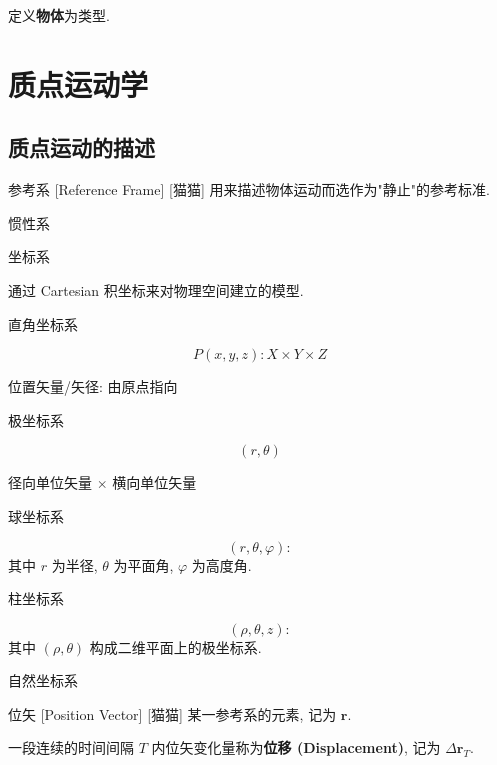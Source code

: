 \documentclass[UTF8]{ctexart}
\begin{document}
        \begin{dfn}
            定义\textbf{物体}为类型. 
        \end{dfn}

\section{质点运动学}

    \subsection{质点运动的描述}
        
        \begin{dfn}
            []
            {参考系}
            [Reference Frame]
            [猫猫]
            用来描述物体运动而选作为"静止"的参考标准. 
        
            惯性系
        
            坐标系
        
                通过 Cartesian 积坐标来对物理空间建立的模型. 
        
                直角坐标系
        
                    $$P(x,y,z) : X\times Y\times Z$$
        
                    位置矢量/矢径: 由原点指向
        
                极坐标系
        
                    $$(r,\theta)$$
        
                    径向单位矢量 $\times$ 横向单位矢量
                
                球坐标系
        
                    $$(r,\theta,\varphi) : $$
                    其中 $r$ 为半径, $\theta$ 为平面角, $\varphi$ 为高度角. 
        
                柱坐标系
        
                    $$(\rho,\theta,z) : $$
                    其中 $(\rho,\theta)$ 构成二维平面上的极坐标系. 
        
                自然坐标系
        \end{dfn}
        
        \begin{dfn}
            []
            {位矢}
            [Position Vector]
            [猫猫]
            某一参考系的元素, 记为 \(\bm{r}\). 

            一段连续的时间间隔 \(T\) 内位矢变化量称为\textbf{位移 (Displacement)}, 记为 \(\Delta\bm{r}_T\). 
        \end{dfn}
        
\end{document}
